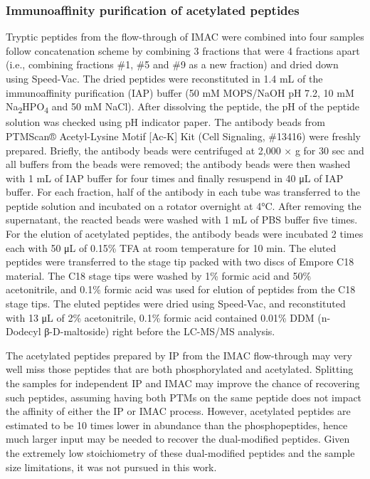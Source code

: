 \subsubsection{Immunoaffinity purification of acetylated peptides}
Tryptic peptides from the flow-through of IMAC were combined into four samples follow concatenation scheme by combining 3 fractions that were 4 fractions apart (i.e., combining fractions \#1, \#5 and \#9 as a new fraction) and dried down using Speed-Vac. The dried peptides were reconstituted in 1.4 mL of the immunoaffinity purification (IAP) buffer (50 mM MOPS/NaOH pH 7.2, 10 mM Na\textsubscript{2}HPO\textsubscript{4} and 50 mM NaCl). After dissolving the peptide, the pH of the peptide solution was checked using pH indicator paper. The antibody beads from PTMScan® Acetyl-Lysine Motif [Ac-K] Kit (Cell Signaling, \#13416) were freshly prepared. Briefly, the antibody beads were centrifuged at 2,000 × g for 30 sec and all buffers from the beads were removed; the antibody beads were then washed with 1 mL of IAP buffer for four times and finally resuspend in 40 μL of IAP buffer. For each fraction, half of the antibody in each tube was transferred to the peptide solution and incubated on a rotator overnight at 4°C. After removing the supernatant, the reacted beads were washed with 1 mL of PBS buffer five times. For the elution of acetylated peptides, the antibody beads were incubated 2 times each with 50 μL of 0.15\% TFA at room temperature for 10 min. The eluted peptides were transferred to the stage tip packed with two discs of Empore C18 material. The C18 stage tips were washed by 1\% formic acid and 50\% acetonitrile, and 0.1\% formic acid was used for elution of peptides from the C18 stage tips. The eluted peptides were dried using Speed-Vac, and reconstituted with 13 μL of 2\% acetonitrile, 0.1\% formic acid contained 0.01\% DDM (n-Dodecyl β-D-maltoside) right before the LC-MS/MS analysis.

The acetylated peptides prepared by IP from the IMAC flow-through may very well miss those peptides that are both phosphorylated and acetylated. Splitting the samples for independent IP and IMAC may improve the chance of recovering such peptides, assuming having both PTMs on the same peptide does not impact the affinity of either the IP or IMAC process. However, acetylated peptides are estimated to be 10 times lower in abundance than the phosphopeptides, hence much larger input may be needed to recover the dual-modified peptides. Given the extremely low stoichiometry of these dual-modified peptides and the sample size limitations, it was not pursued in this work.

